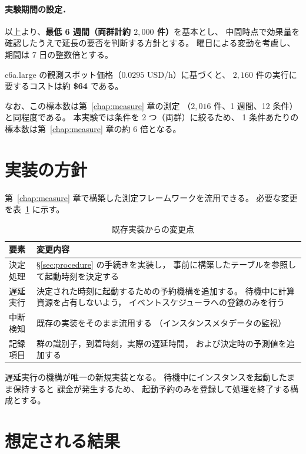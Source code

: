 \documentclass[11pt,a4paper]{ltjsreport}
\begin{document}
\paragraph{実験期間の設定．}
以上より、\textbf{最低 6 週間（両群計約 $2{,}000$ 件）}を基本とし、
中間時点で効果量を確認したうえで延長の要否を判断する方針とする。
曜日による変動を考慮し、期間は 7 日の整数倍とする。

c6a.large の観測スポット価格（$0.0295$ USD/h）に基づくと、
$2{,}160$ 件の実行に要するコストは約 \textbf{\$64} である。

なお、この標本数は第~\ref{chap:measure} 章の測定
（$2{,}016$ 件、1 週間、12 条件）と同程度である。
本実験では条件を 2 つ（両群）に絞るため、
1 条件あたりの標本数は第~\ref{chap:measure} 章の約 6 倍となる。

\section{実装の方針}

第~\ref{chap:measure} 章で構築した測定フレームワークを流用できる。
必要な変更を表~\ref{tab:impl} に示す。

\begin{table}[htbp]
\centering
\caption{既存実装からの変更点}
\label{tab:impl}
\small
\begin{tabularx}{\textwidth}{@{}lX@{}}
\toprule
要素 & 変更内容 \\
\midrule
決定処理 & \S\ref{sec:procedure} の手続きを実装し，
           事前に構築したテーブルを参照して起動時刻を決定する \\
\addlinespace
遅延実行 & 決定された時刻に起動するための予約機構を追加する。
           待機中に計算資源を占有しないよう，
           イベントスケジューラへの登録のみを行う \\
\addlinespace
中断検知 & 既存の実装をそのまま流用する
           （インスタンスメタデータの監視） \\
\addlinespace
記録項目 & 群の識別子，到着時刻，実際の遅延時間，
           および決定時の予測値を追加する \\
\bottomrule
\end{tabularx}
\end{table}

遅延実行の機構が唯一の新規実装となる。
待機中にインスタンスを起動したまま保持すると
課金が発生するため、
起動予約のみを登録して処理を終了する構成とする。

\section{想定される結果}
\end{document}
